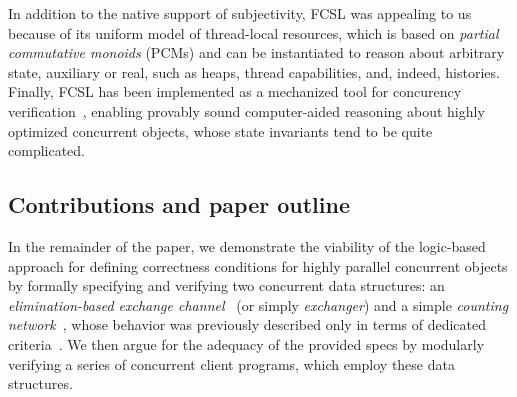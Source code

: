 In addition to the native support of subjectivity, FCSL was appealing
to us because of its uniform model of thread-local resources, which is
based on \emph{partial commutative monoids} (PCMs) and can be
instantiated to reason about arbitrary state, auxiliary or real, such
as heaps, thread capabilities, and, indeed, histories.
%
Finally, FCSL has been implemented as a mechanized tool for concurency
verification~\cite{Sergey-al:PLDI15}, enabling provably sound
computer-aided reasoning about highly optimized concurrent objects,
whose state invariants tend to be quite complicated.


\subsection{Contributions and paper outline}
\label{sec:contr-paper-outl}

In the remainder of the paper, we demonstrate the viability of the
logic-based approach for defining correctness conditions for highly
parallel concurrent objects by formally specifying and verifying two
concurrent data structures: an \emph{elimination-based exchange
  channel}~\cite{Scherer-al:SCOOL05} (or simply \emph{exchanger}) and
a simple \emph{counting network}~\cite{Aspnes-al:JACM94}, whose
behavior was previously described only in terms of dedicated
criteria~\cite{Hemed-Rinetzky:PODC14,Derrick-al:FM14,Jagadeesan-Riely:ICALP14}. We
then argue for the adequacy of the provided specs by modularly
verifying a series of concurrent client programs, which employ these
data structures.

